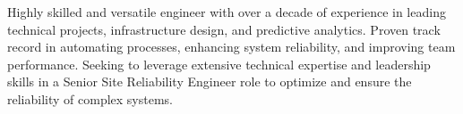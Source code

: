 \documentclass[8pt]{developercv}
\begin{document}
\vspace{0.5cm}



\begin{minipage}[t]{0.4\textwidth} %
	\vspace{-\baselineskip} %

	Highly skilled and versatile engineer with over a decade of experience in
	leading technical projects, infrastructure design, and predictive analytics.
	Proven track record in automating processes, enhancing system reliability, and
	improving team performance. Seeking to leverage extensive technical expertise
	and leadership skills in a Senior Site Reliability Engineer role to optimize
	and ensure the reliability of complex systems.\\
\end{minipage}
\hfill %
\begin{minipage}[t]{0.5\textwidth} %
	\vspace{-\baselineskip} %
	\begin{barchart}{5.5}
	\end{barchart}
\end{minipage}
\begin{center}
\end{center}


\end{document}

